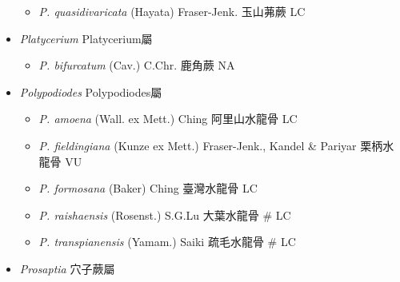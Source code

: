 \begin{itemize}
  \begin{itemize}
        \item[] \textit{P. quasidivaricata} (Hayata) Fraser-Jenk.  玉山茀蕨   LC
  \end{itemize}
 \item[] \textit{Platycerium} Platycerium屬
                                
  \begin{itemize}
        \item[] \textit{P. bifurcatum} (Cav.) C.Chr.  鹿角蕨   NA
  \end{itemize}
 \item[] \textit{Polypodiodes} Polypodiodes屬
                                
  \begin{itemize}
        \item[] \textit{P. amoena} (Wall. ex Mett.) Ching  阿里山水龍骨   LC
        \item[] \textit{P. fieldingiana} (Kunze ex Mett.) Fraser-Jenk., Kandel \& Pariyar  栗柄水龍骨   VU
        \item[] \textit{P. formosana} (Baker) Ching  臺灣水龍骨   LC
        \item[] \textit{P. raishaensis} (Rosenst.) S.G.Lu  大葉水龍骨  \# LC
        \item[] \textit{P. transpianensis} (Yamam.) Saiki  疏毛水龍骨  \# LC
  \end{itemize}
 \item[] \textit{Prosaptia} 穴子蕨屬
                                

\end{itemize}
